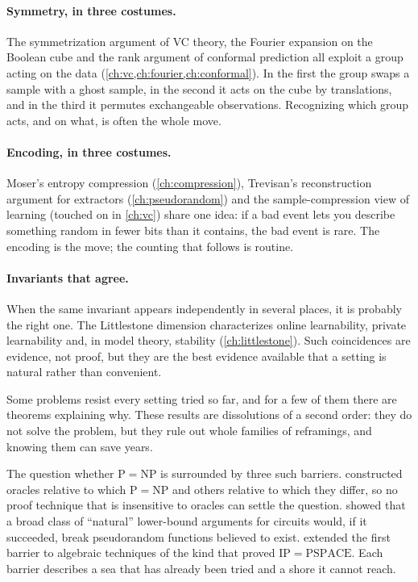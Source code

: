 \begin{refsection}
\paragraph{Symmetry, in three costumes.} The symmetrization argument of VC theory, the Fourier expansion on the Boolean cube and the rank argument of conformal prediction all exploit a group acting on the data (\cref{ch:vc,ch:fourier,ch:conformal}). In the first the group swaps a sample with a ghost sample, in the second it acts on the cube by translations, and in the third it permutes exchangeable observations. Recognizing which group acts, and on what, is often the whole move.

\paragraph{Encoding, in three costumes.} Moser's entropy compression (\cref{ch:compression}), Trevisan's reconstruction argument for extractors (\cref{ch:pseudorandom}) and the sample-compression view of learning (touched on in \cref{ch:vc}) share one idea: if a bad event lets you describe something random in fewer bits than it contains, the bad event is rare. The encoding is the move; the counting that follows is routine.

\paragraph{Invariants that agree.} When the same invariant appears independently in several places, it is probably the right one. The Littlestone dimension characterizes online learnability, private learnability and, in model theory, stability (\cref{ch:littlestone}). Such coincidences are evidence, not proof, but they are the best evidence available that a setting is natural rather than convenient.


Some problems resist every setting tried so far, and for a few of them there are theorems explaining why. These  results are dissolutions of a second order: they do not solve the problem, but they rule out whole families of reframings, and knowing them can save years.

The question whether $\mathrm{P}=\mathrm{NP}$ is surrounded by three such barriers. \textcite{BakerGillSolovay1975} constructed oracles relative to which $\mathrm{P}=\mathrm{NP}$ and others relative to which they differ, so no proof technique that is insensitive to oracles can settle the question. \textcite{RazborovRudich1997} showed that a broad class of ``natural'' lower-bound arguments for circuits would, if it succeeded, break pseudorandom functions believed to exist. \textcite{AaronsonWigderson2009} extended the first barrier to algebraic techniques of the kind that proved $\mathrm{IP}=\mathrm{PSPACE}$. Each barrier describes a sea that has already been tried and a shore it cannot reach.


\end{refsection}
